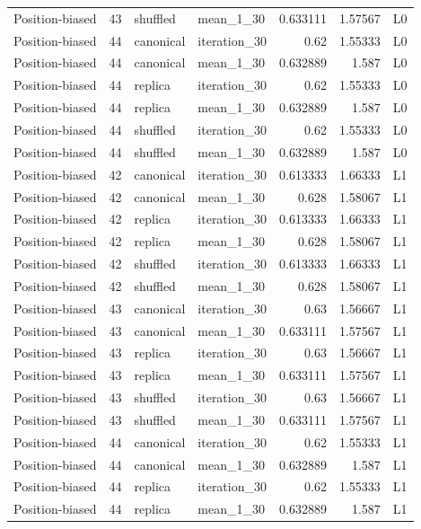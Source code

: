 \begin{table}[htbp!]
\begin{tabular}{lrllrrl}
Position-biased & 43 & shuffled & mean\_1\_30 & 0.633111 & 1.57567 & L0 \\
Position-biased & 44 & canonical & iteration\_30 & 0.62 & 1.55333 & L0 \\
Position-biased & 44 & canonical & mean\_1\_30 & 0.632889 & 1.587 & L0 \\
Position-biased & 44 & replica & iteration\_30 & 0.62 & 1.55333 & L0 \\
Position-biased & 44 & replica & mean\_1\_30 & 0.632889 & 1.587 & L0 \\
Position-biased & 44 & shuffled & iteration\_30 & 0.62 & 1.55333 & L0 \\
Position-biased & 44 & shuffled & mean\_1\_30 & 0.632889 & 1.587 & L0 \\
Position-biased & 42 & canonical & iteration\_30 & 0.613333 & 1.66333 & L1 \\
Position-biased & 42 & canonical & mean\_1\_30 & 0.628 & 1.58067 & L1 \\
Position-biased & 42 & replica & iteration\_30 & 0.613333 & 1.66333 & L1 \\
Position-biased & 42 & replica & mean\_1\_30 & 0.628 & 1.58067 & L1 \\
Position-biased & 42 & shuffled & iteration\_30 & 0.613333 & 1.66333 & L1 \\
Position-biased & 42 & shuffled & mean\_1\_30 & 0.628 & 1.58067 & L1 \\
Position-biased & 43 & canonical & iteration\_30 & 0.63 & 1.56667 & L1 \\
Position-biased & 43 & canonical & mean\_1\_30 & 0.633111 & 1.57567 & L1 \\
Position-biased & 43 & replica & iteration\_30 & 0.63 & 1.56667 & L1 \\
Position-biased & 43 & replica & mean\_1\_30 & 0.633111 & 1.57567 & L1 \\
Position-biased & 43 & shuffled & iteration\_30 & 0.63 & 1.56667 & L1 \\
Position-biased & 43 & shuffled & mean\_1\_30 & 0.633111 & 1.57567 & L1 \\
Position-biased & 44 & canonical & iteration\_30 & 0.62 & 1.55333 & L1 \\
Position-biased & 44 & canonical & mean\_1\_30 & 0.632889 & 1.587 & L1 \\
Position-biased & 44 & replica & iteration\_30 & 0.62 & 1.55333 & L1 \\
Position-biased & 44 & replica & mean\_1\_30 & 0.632889 & 1.587 & L1 \\

\end{tabular}
\end{table}
